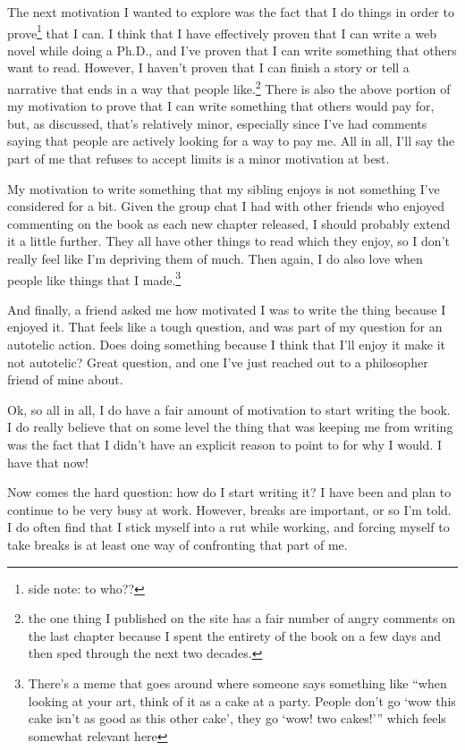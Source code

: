 \documentclass[12pt]{article}[titlepage]
\newcommand{\say}[1]{``#1''}
\newcommand{\nsay}[1]{`#1'}
\renewcommand{\,}{\textsuperscript{,}}
\begin{document}
The next motivation I wanted to explore was the fact that I do things in order to prove\footnote{side note: to who??} that I can.  
I think that I have effectively proven that I can write a web novel while doing a Ph.D., and I've proven that I can write something that others want to read.  
However, I haven't proven that I can finish a story or tell a narrative that ends in a way that people like.\footnote{the one thing I published on the site has a fair number of angry comments on the last chapter because I spent the entirety of the book on a few days and then sped through the next two decades.}  
There is also the above portion of my motivation to prove that I can write something that others would pay for, but, as discussed, that's relatively minor, especially since I've had comments saying that people are actively looking for a way to pay me.  
All in all, I'll say the part of me that refuses to accept limits is a minor motivation at best.

My motivation to write something that my sibling enjoys is not something I've considered for a bit.  
Given the group chat I had with other friends who enjoyed commenting on the book as each new chapter released, I should probably extend it a little further.  
They all have other things to read which they enjoy, so I don't really feel like I'm depriving them of much.  
Then again, I do also love when people like things that I made.\footnote{There's a meme that goes around where someone says something like \say{when looking at your art, think of it as a cake at a party. People don't go \nsay{wow this cake isn't as good as this other cake}, they go \nsay{wow! two cakes!}} which feels somewhat relevant here}

And finally, a friend asked me how motivated I was to write the thing because I enjoyed it.  
That feels like a tough question, and was part of my question for an autotelic action.  
Does doing something because I think that I'll enjoy it make it not autotelic?  
Great question, and one I've just reached out to a philosopher friend of mine about.

Ok, so all in all, I do have a fair amount of motivation to start writing the book.  
I do really believe that on some level the thing that was keeping me from writing was the fact that I didn't have an explicit reason to point to for why I would.  
I have that now!

Now comes the hard question: how do I start writing it?  
I have been and plan to continue to be very busy at work.  
However, breaks are important, or so I'm told.  
I do often find that I stick myself into a rut while working, and forcing myself to take breaks is at least one way of confronting that part of me.
\end{document}
